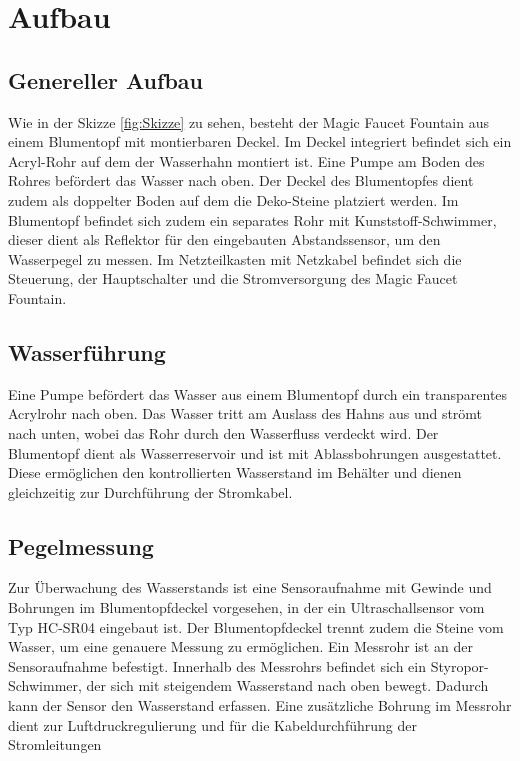 %
%
%

\chapter{Aufbau}
\section{Genereller Aufbau}
Wie in der Skizze \ref{fig:Skizze} zu sehen, besteht der Magic Faucet Fountain aus einem Blumentopf mit montierbaren Deckel. Im Deckel integriert befindet sich ein Acryl-Rohr auf dem der Wasserhahn montiert ist. Eine Pumpe am Boden des Rohres befördert das Wasser nach oben. Der Deckel des Blumentopfes dient zudem als doppelter Boden auf dem die Deko-Steine platziert werden. Im Blumentopf befindet sich zudem ein separates Rohr mit Kunststoff-Schwimmer, dieser dient als Reflektor für den eingebauten Abstandssensor, um den Wasserpegel zu messen. Im Netzteilkasten mit Netzkabel befindet sich die Steuerung, der Hauptschalter und die Stromversorgung des Magic Faucet Fountain.

\section{Wasserführung}
Eine Pumpe befördert das Wasser aus einem Blumentopf durch ein transparentes Acrylrohr nach oben. Das Wasser tritt am Auslass des Hahns aus und strömt nach unten, wobei das Rohr durch den Wasserfluss verdeckt wird.
Der Blumentopf dient als Wasserreservoir und ist mit Ablassbohrungen ausgestattet. Diese ermöglichen den kontrollierten Wasserstand im Behälter und dienen gleichzeitig zur Durchführung der Stromkabel.

\section{Pegelmessung}
Zur Überwachung des Wasserstands ist eine Sensoraufnahme mit Gewinde und Bohrungen im Blumentopfdeckel vorgesehen, in der ein Ultraschallsensor vom Typ HC-SR04 eingebaut ist. Der Blumentopfdeckel trennt zudem die Steine vom Wasser, um eine genauere Messung zu ermöglichen.
Ein Messrohr ist an der Sensoraufnahme befestigt. Innerhalb des Messrohrs befindet sich ein Styropor-Schwimmer, der sich mit steigendem Wasserstand nach oben bewegt. Dadurch kann der Sensor den Wasserstand erfassen. Eine zusätzliche Bohrung im Messrohr dient zur Luftdruckregulierung und für die Kabeldurchführung der Stromleitungen

